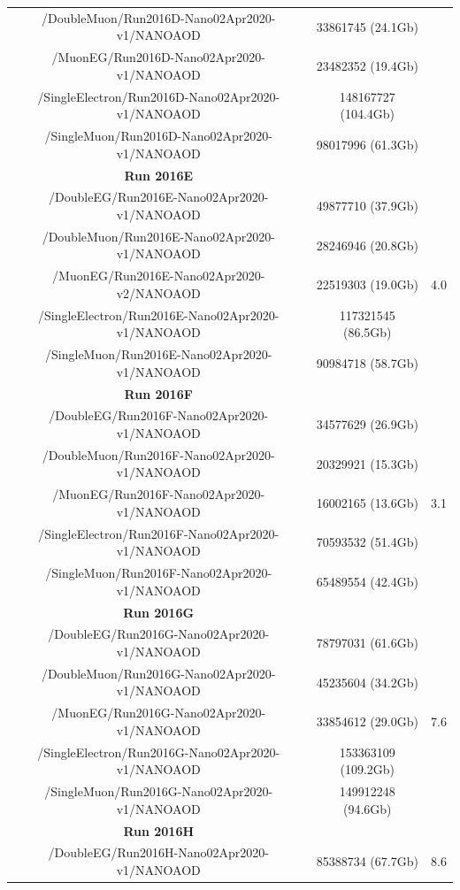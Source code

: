 \documentclass[a4paper, 10pt, openright]{report}
\begin{document}
\begin{appendices}
\begin{table}
\begin{center}
{\begin{tabular}{ c|c|c }
 /DoubleMuon/Run2016D-Nano02Apr2020-v1/NANOAOD & 33861745 (24.1Gb) & \\
 /MuonEG/Run2016D-Nano02Apr2020-v1/NANOAOD & 23482352 (19.4Gb) & \\
 /SingleElectron/Run2016D-Nano02Apr2020-v1/NANOAOD & 148167727 (104.4Gb) & \\
 /SingleMuon/Run2016D-Nano02Apr2020-v1/NANOAOD & 98017996 (61.3Gb) & \\
 \hline
 \textbf{Run 2016E} & & \\
 /DoubleEG/Run2016E-Nano02Apr2020-v1/NANOAOD & 49877710 (37.9Gb) & \multirow{ 5}{*}{4.0} \\
 /DoubleMuon/Run2016E-Nano02Apr2020-v1/NANOAOD & 28246946 (20.8Gb) & \\
 /MuonEG/Run2016E-Nano02Apr2020-v2/NANOAOD & 22519303 (19.0Gb) & \\
 /SingleElectron/Run2016E-Nano02Apr2020-v1/NANOAOD & 117321545 (86.5Gb) & \\
 /SingleMuon/Run2016E-Nano02Apr2020-v1/NANOAOD & 90984718 (58.7Gb) & \\
 \hline
 \textbf{Run 2016F} & & \\
 /DoubleEG/Run2016F-Nano02Apr2020-v1/NANOAOD & 34577629 (26.9Gb) & \multirow{ 5}{*}{3.1} \\
 /DoubleMuon/Run2016F-Nano02Apr2020-v1/NANOAOD & 20329921 (15.3Gb) & \\
 /MuonEG/Run2016F-Nano02Apr2020-v1/NANOAOD & 16002165 (13.6Gb) & \\
 /SingleElectron/Run2016F-Nano02Apr2020-v1/NANOAOD & 70593532 (51.4Gb) & \\
 /SingleMuon/Run2016F-Nano02Apr2020-v1/NANOAOD & 65489554 (42.4Gb) & \\
 \hline
 \textbf{Run 2016G} & & \\
 /DoubleEG/Run2016G-Nano02Apr2020-v1/NANOAOD & 78797031 (61.6Gb) & \multirow{ 5}{*}{7.6} \\
 /DoubleMuon/Run2016G-Nano02Apr2020-v1/NANOAOD & 45235604 (34.2Gb) & \\
 /MuonEG/Run2016G-Nano02Apr2020-v1/NANOAOD & 33854612 (29.0Gb) & \\
 /SingleElectron/Run2016G-Nano02Apr2020-v1/NANOAOD & 153363109 (109.2Gb) & \\
 /SingleMuon/Run2016G-Nano02Apr2020-v1/NANOAOD & 149912248 (94.6Gb) & \\
 \hline
 \textbf{Run 2016H} & & \\
 /DoubleEG/Run2016H-Nano02Apr2020-v1/NANOAOD & 85388734 (67.7Gb) & \multirow{ 5}{*}{8.6} \\

\end{tabular}}
\end{center}
\end{table}
\end{appendices}
\end{document}
